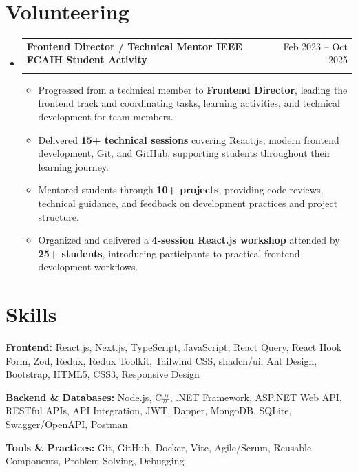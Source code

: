 \documentclass[letterpaper,10pt]{article}
\makeatletter
\newcommand{\resumeItem}[1]{
  \item\footnotesize{
    #1 \vspace{-2pt}
  }
}
\newcommand{\resumeSubheading}[4]{
  \vspace{-2pt}\item
    \begin{tabular*}{0.97\textwidth}{l@{\extracolsep{\fill}}r}
      \textbf{#1} & \footnotesize{#2} \\
      \textit{\footnotesize#3} & \textit{\footnotesize #4} \\
    \end{tabular*}\vspace{-7pt}
}
\newcommand{\resumeProjectHeading}[2]{
    \item
    \begin{tabular*}{0.97\textwidth}{l@{\extracolsep{\fill}}r}
      \footnotesize#1 & #2 \\
    \end{tabular*}\vspace{-7pt}
}
\newcommand{\resumeSubHeadingListStart}{\begin{itemize}[leftmargin=0.15in, label={}]}
\newcommand{\resumeSubHeadingListEnd}{\end{itemize}}
\newcommand{\resumeItemListStart}{\begin{itemize}}
\newcommand{\resumeItemListEnd}{\end{itemize}\vspace{-5pt}}
\makeatother
\begin{document}
\section{Volunteering}
  \resumeSubHeadingListStart

\resumeSubheading
  {Frontend Director / Technical Mentor IEEE FCAIH Student Activity}{Feb 2023 -- Oct 2025}
  {}{}
  \resumeItemListStart
    \resumeItem{Progressed from a technical member to \textbf{Frontend Director}, leading the frontend track and coordinating tasks, learning activities, and technical development for team members.}
    \resumeItem{Delivered \textbf{15+ technical sessions} covering React.js, modern frontend development, Git, and GitHub, supporting students throughout their learning journey.}
    \resumeItem{Mentored students through \textbf{10+ projects}, providing code reviews, technical guidance, and feedback on development practices and project structure.}
    \resumeItem{Organized and delivered a \textbf{4-session React.js workshop} attended by \textbf{25+ students}, introducing participants to practical frontend development workflows.}
  \resumeItemListEnd


  \resumeSubHeadingListEnd

\section{Skills}
     \textbf{Frontend:} React.js, Next.js, TypeScript, JavaScript, React Query, React Hook Form, Zod, Redux, Redux Toolkit, Tailwind CSS, shadcn/ui, Ant Design, Bootstrap, HTML5, CSS3, Responsive Design 
          \vspace{1pt}

     \textbf{Backend \& Databases:} Node.js, C\#, .NET Framework, ASP.NET Web API, RESTful APIs, API Integration, JWT, Dapper, MongoDB, SQLite, Swagger/OpenAPI, Postman \\
     \vspace{1pt}

     \textbf{Tools \& Practices:} Git, GitHub, Docker, Vite, Agile/Scrum, Reusable Components, Problem Solving, Debugging
 \vspace{-8pt}

\end{document}
